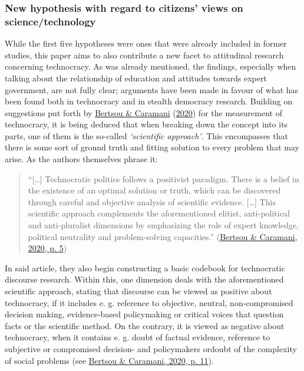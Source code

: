 \documentclass[
  12pt,
  english,
]{article}
\begin{document}
\hypertarget{new-hypothesis-with-regard-to-citizens-views-on-sciencetechnology}{%
\subsubsection{New hypothesis with regard to citizens' views on
science/technology}\label{new-hypothesis-with-regard-to-citizens-views-on-sciencetechnology}}

While the first five hypotheses were ones that were already included in
former studies, this paper aims to also contribute a new facet to
attitudinal research concerning technocracy. As was already mentioned,
the findings, especially when talking about the relationship of
education and attitudes towards expert government, are not fully clear;
arguments have been made in favour of what has been found both in
technocracy and in stealth democracy research. Building on suggestions
put forth by \protect\hyperlink{ref-bertsou2020measuring}{Bertsou \&
Caramani} (\protect\hyperlink{ref-bertsou2020measuring}{2020}) for the
measurement of technocracy, it is being deduced that when breaking down
the concept into its parts, one of them is the so-called
\emph{`scientific approach'}. This encompasses that there is some sort
of ground truth and fitting solution to every problem that may arise. As
the authors themselves phrase it:

\begin{quote}
``{[}\ldots{]} Technocratic politics follows a positivist paradigm.
There is a belief in the existence of an optimal solution or truth,
which can be discovered through careful and objective analysis of
scientific evidence. {[}\ldots{]} This scientific approach complements
the aforementioned elitist, anti-political and anti-pluralist dimensions
by emphasizing the role of expert knowledge, political neutrality and
problem-solving capacities.''
(\protect\hyperlink{ref-bertsou2020measuring}{Bertsou \& Caramani, 2020,
p. 5})
\end{quote}

In said article, they also begin constructing a basic codebook for
technocratic discourse research. Within this, one dimension deals with
the aforementioned scientific approach, stating that discourse can be
viewed as positive about technocracy, if it includes e. g. reference to
objective, neutral, non-compromised decision making, evidence-based
policymaking or critical voices that question facts or the scientific
method. On the contrary, it is viewed as negative about technocracy,
when it contains e. g. doubt of factual evidence, reference to
subjective or compromised decision- and policymakers ordoubt of the
complexity of social problems (see
\protect\hyperlink{ref-bertsou2020measuring}{Bertsou \& Caramani, 2020,
p. 11}).
\end{document}
